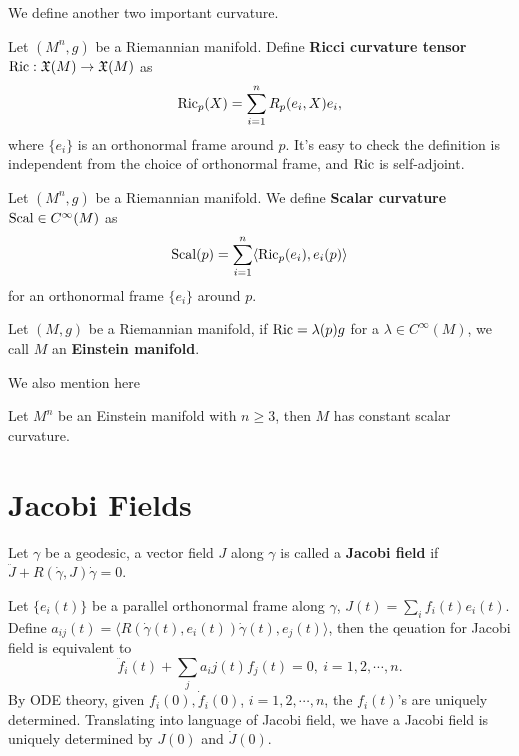 We define another two important curvature.
\begin{defn}
    Let $(M^n,g)$ be a Riemannian manifold.
    Define \textbf{Ricci curvature tensor} $\operatorname{Ric}:\mathfrak{X}(M)\to\mathfrak{X}(M)$ as
    \[\operatorname{Ric}_p(X)=\sum_{i=1}^nR_p(e_i,X)e_i,\]
    where $\{e_i\}$ is an orthonormal frame around $p$.
    It's easy to check the definition is independent from the choice of orthonormal frame, and $\operatorname{Ric}$ is self-adjoint.
\end{defn}

\begin{defn}
    Let $(M^n,g)$ be a Riemannian manifold.
    We define \textbf{Scalar curvature} $\operatorname{Scal}\in C^\infty(M)$ as
    \[\operatorname{Scal}(p)=\sum_{i=1}^n\langle\operatorname{Ric}_p(e_i),e_i(p)\rangle\]
    for an orthonormal frame $\{e_i\}$ around $p$.
\end{defn}

\begin{defn}
    Let $(M,g)$ be a Riemannian manifold, if $\operatorname{Ric}=\lambda(p)g$ for a $\lambda\in C^\infty(M)$, we call $M$ an \textbf{Einstein manifold}.
\end{defn}

We also mention here
\begin{thm}[Schur]
    Let $M^n$ be an Einstein manifold with $n\geq 3$, then $M$ has constant scalar curvature.    
\end{thm}

\section{Jacobi Fields}

\begin{defn}
    Let $\gamma$ be a geodesic, a vector field $J$ along $\gamma$ is called a \textbf{Jacobi field} if $\ddot{J}+R(\dot{\gamma},J)\dot{\gamma}=0$.
\end{defn}

Let $\{e_i(t)\}$ be a parallel orthonormal frame along $\gamma$, $J(t)=\sum_if_i(t)e_i(t)$.
Define $a_{ij}(t)=\langle R(\dot{\gamma}(t),e_i(t))\dot{\gamma}(t),e_j(t)\rangle$, then the qeuation for Jacobi field is equivalent to
\[\ddot{f}_i(t)+\sum_ja_ij(t)f_j(t)=0,\ i=1,2,\cdots,n.\]
By ODE theory, given $f_i(0),\dot{f}_i(0)$, $i=1,2,\cdots,n$, the $f_i(t)$'s are uniquely determined.
Translating into language of Jacobi field, we have a Jacobi field is uniquely determined by $J(0)$ and $\dot{J}(0)$.

